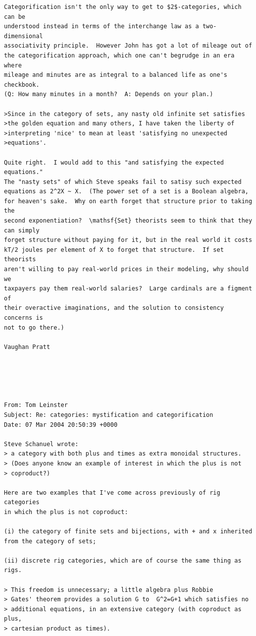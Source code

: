 \documentclass{article}
\begin{document}
\begin{verbatim}
Categorification isn't the only way to get to $2$-categories, which can be
understood instead in terms of the interchange law as a two-dimensional
associativity principle.  However John has got a lot of mileage out of
the categorification approach, which one can't begrudge in an era where
mileage and minutes are as integral to a balanced life as one's checkbook.
(Q: How many minutes in a month?  A: Depends on your plan.)

>Since in the category of sets, any nasty old infinite set satisfies
>the golden equation and many others, I have taken the liberty of
>interpreting 'nice' to mean at least 'satisfying no unexpected
>equations'.

Quite right.  I would add to this "and satisfying the expected equations."
The "nasty sets" of which Steve speaks fail to satisy such expected
equations as 2^2X ~ X.  (The power set of a set is a Boolean algebra,
for heaven's sake.  Why on earth forget that structure prior to taking the
second exponentiation?  \mathsf{Set} theorists seem to think that they can simply
forget structure without paying for it, but in the real world it costs
kT/2 joules per element of X to forget that structure.  If set theorists
aren't willing to pay real-world prices in their modeling, why should we
taxpayers pay them real-world salaries?  Large cardinals are a figment of
their overactive imaginations, and the solution to consistency concerns is
not to go there.)

Vaughan Pratt





From: Tom Leinster 
Subject: Re: categories: mystification and categorification
Date: 07 Mar 2004 20:50:39 +0000

Steve Schanuel wrote:
> a category with both plus and times as extra monoidal structures.
> (Does anyone know an example of interest in which the plus is not
> coproduct?) 

Here are two examples that I've come across previously of rig categories
in which the plus is not coproduct:

(i) the category of finite sets and bijections, with + and x inherited
from the category of sets;

(ii) discrete rig categories, which are of course the same thing as
rigs.

> This freedom is unnecessary; a little algebra plus Robbie
> Gates' theorem provides a solution G to  G^2=G+1 which satisfies no
> additional equations, in an extensive category (with coproduct as plus,
> cartesian product as times).


\end{verbatim}
\end{document}

